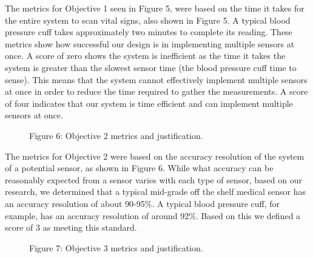 ﻿\documentclass[10pt]{article}
\begin{document}
The metrics for Objective 1 seen in Figure 5, were based on the time it takes for the entire system to scan vital signs, also shown in Figure 5. A typical blood pressure cuff takes approximately two minutes to complete its reading. These metrics show how successful our design is in implementing multiple sensors at once. A score of zero shows the system is inefficient as the time it takes the system is greater than the slowest sensor time (the blood pressure cuff time to sense). This means that the system cannot effectively implement multiple sensors at once in order to reduce the time required to gather the measurements. A score of four indicates that our system is time efficient and can implement multiple sensors at once. 
%
%
%
%
\begin{figure}
\caption{Figure 6: Objective 2 metrics and justification.}
\label{fig:6}
\end{figure}

The metrics for Objective 2 were based on the accuracy resolution of the system of a potential sensor, as shown in Figure 6. While what accuracy can be reasonably expected from a sensor varies with each type of sensor, based on our research, we determined that a typical mid-grade off the shelf medical sensor has an accuracy resolution of about 90-95\%. A typical blood pressure cuff, for example, has an accuracy resolution of around 92\%. Based on this we defined a score of 3 as meeting this standard.

%
%	
\begin{figure}
\caption{Figure 7: Objective 3 metrics and justification.}
\label{fig:7}
\end{figure}
\end{document}
